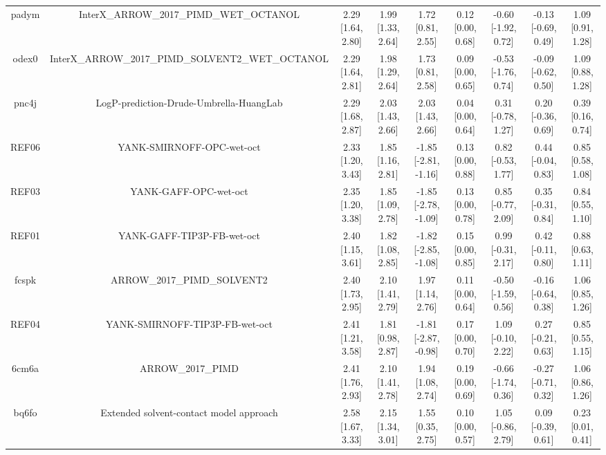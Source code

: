 \documentclass{article}
\begin{document}
\begin{center}
\begin{longtable}{|ccccccccc|}
 padym &            InterX\_ARROW\_2017\_PIMD\_WET\_OCTANOL &  2.29 [1.64, 2.80] &  1.99 [1.33, 2.64] &     1.72 [0.81, 2.55] &  0.12 [0.00, 0.68] &  -0.60 [-1.92, 0.72] &  -0.13 [-0.69, 0.49] &     1.09 [0.91, 1.28] \\
 odex0 &  InterX\_ARROW\_2017\_PIMD\_SOLVENT2\_WET\_OCTANOL &  2.29 [1.64, 2.81] &  1.98 [1.29, 2.64] &     1.73 [0.81, 2.58] &  0.09 [0.00, 0.65] &  -0.53 [-1.76, 0.74] &  -0.09 [-0.62, 0.50] &     1.09 [0.88, 1.28] \\
 pnc4j &            LogP-prediction-Drude-Umbrella-HuangLab &  2.29 [1.68, 2.87] &  2.03 [1.43, 2.66] &     2.03 [1.43, 2.66] &  0.04 [0.00, 0.64] &   0.31 [-0.78, 1.27] &   0.20 [-0.36, 0.69] &     0.39 [0.16, 0.74] \\
 REF06 &                          YANK-SMIRNOFF-OPC-wet-oct &  2.33 [1.20, 3.43] &  1.85 [1.16, 2.81] &  -1.85 [-2.81, -1.16] &  0.13 [0.00, 0.88] &   0.82 [-0.53, 1.77] &   0.44 [-0.04, 0.83] &     0.85 [0.58, 1.08] \\
 REF03 &                              YANK-GAFF-OPC-wet-oct &  2.35 [1.20, 3.38] &  1.85 [1.09, 2.78] &  -1.85 [-2.78, -1.09] &  0.13 [0.00, 0.78] &   0.85 [-0.77, 2.09] &   0.35 [-0.31, 0.84] &     0.84 [0.55, 1.10] \\
 REF01 &                         YANK-GAFF-TIP3P-FB-wet-oct &  2.40 [1.15, 3.61] &  1.82 [1.08, 2.85] &  -1.82 [-2.85, -1.08] &  0.15 [0.00, 0.85] &   0.99 [-0.31, 2.17] &   0.42 [-0.11, 0.80] &     0.88 [0.63, 1.11] \\
 fcspk &                        ARROW\_2017\_PIMD\_SOLVENT2 &  2.40 [1.73, 2.95] &  2.10 [1.41, 2.79] &     1.97 [1.14, 2.76] &  0.11 [0.00, 0.64] &  -0.50 [-1.59, 0.56] &  -0.16 [-0.64, 0.38] &     1.06 [0.85, 1.26] \\
 REF04 &                     YANK-SMIRNOFF-TIP3P-FB-wet-oct &  2.41 [1.21, 3.58] &  1.81 [0.98, 2.87] &  -1.81 [-2.87, -0.98] &  0.17 [0.00, 0.70] &   1.09 [-0.10, 2.22] &   0.27 [-0.21, 0.63] &     0.85 [0.55, 1.15] \\
 6cm6a &                                  ARROW\_2017\_PIMD &  2.41 [1.76, 2.93] &  2.10 [1.41, 2.78] &     1.94 [1.08, 2.74] &  0.19 [0.00, 0.69] &  -0.66 [-1.74, 0.36] &  -0.27 [-0.71, 0.32] &     1.06 [0.86, 1.26] \\
 bq6fo &            Extended solvent-contact model approach &  2.58 [1.67, 3.33] &  2.15 [1.34, 3.01] &     1.55 [0.35, 2.75] &  0.10 [0.00, 0.57] &   1.05 [-0.86, 2.79] &   0.09 [-0.39, 0.61] &     0.23 [0.01, 0.41] \\

\end{longtable}
\end{center}
\end{document}
